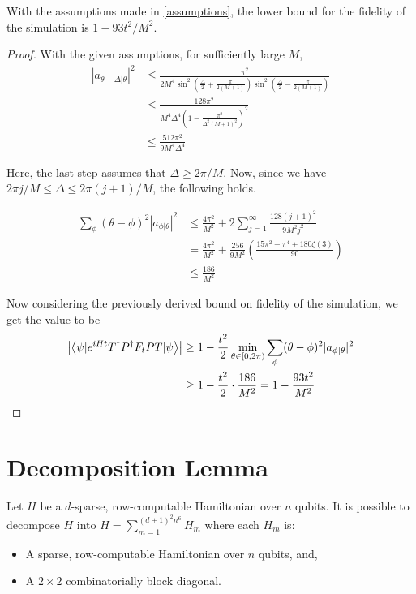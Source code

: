\documentclass[
10pt, %
a4paper, %
oneside, %
headinclude,footinclude, %
BCOR5mm, %
]{scrartcl}
\begin{document}
\begin{theorem}\label{numerical_fidelity_bound}
With the assumptions made in \ref{assumptions}, the lower bound for the fidelity of the simulation is $1 - 93t^2/M^2$.
\end{theorem}
\begin{proof}
With the given assumptions, for sufficiently large $M$,
\begin{align*}
|a_{\theta + \Delta|\theta}|^2 &\leq \frac{\pi^2}{2M^4\sin^2\left(\frac{\Delta}{2} + \frac{\pi}{2(M + 1)}\right)\sin^2\left(\frac{\Delta}{2} - \frac{\pi}{2(M + 1)}\right)}\\
&\leq \frac{128\pi^2}{M^4\Delta^4\left(1 - \frac{\pi^2}{\Delta^2(M + 1)^2}\right)^2}\\
&\leq \frac{512\pi^2}{9M^4\Delta^4}
\end{align*}

Here, the last step assumes that $\Delta \geq 2\pi/M$. Now, since we have $2\pi j/M \leq \Delta \leq 2\pi(j + 1)/M$, the following holds.

\begin{align*}
\sum_{\phi} (\theta - \phi)^2 |a_{\phi|\theta}|^2 &\leq \frac{4\pi^2}{M^2} + 2 \sum_{j = 1}^{\infty}\frac{128(j + 1)^2}{9M^2j^2}\\
&= \frac{4\pi^2}{M^2} + \frac{256}{9M^2}\left(\frac{15\pi^2 + \pi^4 + 180\zeta(3)}{90}\right)\\
&\leq \frac{186}{M^2}
\end{align*}

Now considering the previously derived bound on fidelity of the simulation, we get the value to be
\begin{align*}
\abs{\left<\psi|e^{iHt}T^{\dagger}P^{\dagger}F_tPT|\psi\right>}&\geq1 - \frac{t^2}{2}\min_{\theta \in [0, 2\pi)} \sum_\phi (\theta - \phi)^2 |a_{\phi|\theta}|^2\\
&\geq 1-\frac{t^2}{2}\cdot\frac{186}{M^2}=1-\frac{93t^2}{M^2}
\end{align*}
\end{proof}

\section{Decomposition Lemma}
\begin{theorem}
Let $H$ be a $d$-sparse, row-computable Hamiltonian over $n$ qubits. It is possible to decompose $H$ into $H=\sum_{m=1}^{(d+1)^{2} n^{6}} H_{m}$ where each $H_{m}$ is:

\begin{itemize}
  \item A sparse, row-computable Hamiltonian over $n$ qubits, and,

  \item A $2 \times 2$ combinatorially block diagonal.

\end{itemize}
\end{theorem}
\end{document}
